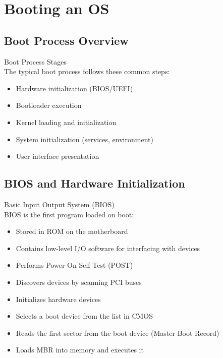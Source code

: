 \section{Booting an OS}

\subsection{Boot Process Overview}

\begin{definition}{Boot Process Stages}\\
    The typical boot process follows these common steps:
    \begin{itemize}
        \item Hardware initialization (BIOS/UEFI)
        \item Bootloader execution
        \item Kernel loading and initialization
        \item System initialization (services, environment)
        \item User interface presentation
    \end{itemize}
\end{definition}

\subsection{BIOS and Hardware Initialization}

\begin{definition}{Basic Input Output System (BIOS)}\\
    BIOS is the first program loaded on boot:
    \begin{itemize}
        \item Stored in ROM on the motherboard
        \item Contains low-level I/O software for interfacing with devices
        \item Performs Power-On Self-Test (POST)
        \item Discovers devices by scanning PCI buses
        \item Initializes hardware devices
        \item Selects a boot device from the list in CMOS
        \item Reads the first sector from the boot device (Master Boot Record)
        \item Loads MBR into memory and executes it
    \end{itemize}
\end{definition}

